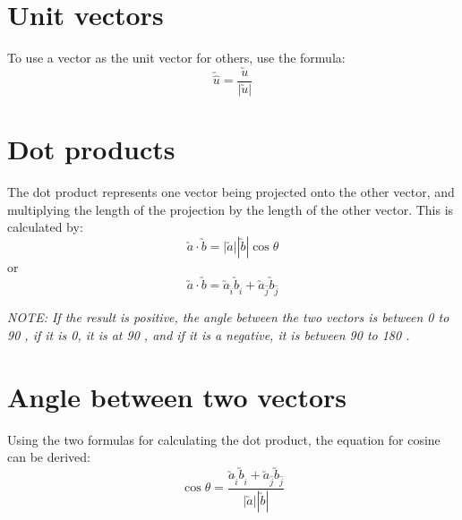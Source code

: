 \documentclass{book}
\newcommand{\note}[1]{\begin{center}\emph{NOTE: {#1}}\end{center}}
\begin{document}
\section{Unit vectors}
To use a vector as the unit vector for others, use the formula:
\[
	\utilde{\hat{u}} = \frac{\utilde{u}}{|\utilde{u}|}
\]

\section{Dot products}
The dot product represents one vector being projected onto the other vector, and multiplying the length of the projection by the length of the other vector.  This is calculated by:
\[\utilde{a} \cdot \utilde{b} = |\utilde{a}||\utilde{b}|\cos\theta\]
or
\[\utilde{a} \cdot \utilde{b} = \utilde{a}_{\hat{i}} \utilde{b}_{\hat{i}} + \utilde{a}_{\hat{j}} \utilde{b}_{\hat{j}}\]

\note{If the result is positive, the angle between the two vectors is between 0 to 90 \degree, if it is 0, it is at 90 \degree, and if it is a negative, it is between 90 to 180 \degree.}


\section{Angle between two vectors}
Using the two formulas for calculating the dot product, the equation for cosine can be derived:
\[
	\cos\theta = \frac{\utilde{a}_{\hat{i}} \utilde{b}_{\hat{i}} + \utilde{a}_{\hat{j}} \utilde{b}_{\hat{j}}}{|\utilde{a}||\utilde{b}|}
\]
\end{document}
